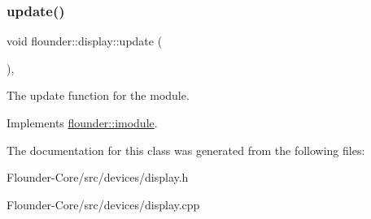 \subsubsection{\texorpdfstring{update()}{update()}}
{\footnotesize\ttfamily void flounder\+::display\+::update (\begin{DoxyParamCaption}{ }\end{DoxyParamCaption})\hspace{0.3cm}{\ttfamily [override]}, {\ttfamily [virtual]}}



The update function for the module. 



Implements \hyperlink{classflounder_1_1imodule_a9a53d48a46b5f6b16a92b2cd8503f74a}{flounder\+::imodule}.



The documentation for this class was generated from the following files\+:\begin{DoxyCompactItemize}
\item 
Flounder-\/\+Core/src/devices/display.\+h\item 
Flounder-\/\+Core/src/devices/display.\+cpp\end{DoxyCompactItemize}
